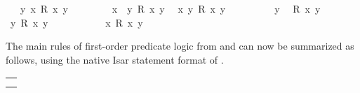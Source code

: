 \begin{isabellebody}
\ \ \ {\isachardoublequoteopen}{\isasymforall}y{\isachardot}\ {\isasymexists}x{\isachardot}\ R\ x\ y{\isachardoublequoteclose}\isanewline
%
\isadelimproof
%
\endisadelimproof
%
\isatagproof
{}\isamarkupfalse%
\ \ \ \ %
\isanewline
\ \ \isamarkupfalse%
\ x\ \ {\isachardoublequoteopen}{\isasymforall}y{\isachardot}\ R\ x\ y{\isachardoublequoteclose}\ \isamarkupfalse%
\ {\isacharbackquoteopen}{\isasymexists}x{\isachardot}\ {\isasymforall}y{\isachardot}\ R\ x\ y{\isacharbackquoteclose}\ \isacommand{{\isachardot}{\isachardot}}\isamarkupfalse%
\ \ \ \ %
\isanewline
\ \ \isamarkupfalse%
\ y\ \isamarkupfalse%
\ {\isachardoublequoteopen}R\ x\ y{\isachardoublequoteclose}\ \isamarkupfalse%
\ {\isacharbackquoteopen}{\isasymforall}y{\isachardot}\ R\ x\ y{\isacharbackquoteclose}\ \isacommand{{\isachardot}{\isachardot}}\isamarkupfalse%
\ \ \ \ %
\isanewline
\ \ \isamarkupfalse%
\ \isamarkupfalse%
\ {\isachardoublequoteopen}{\isasymexists}x{\isachardot}\ R\ x\ y{\isachardoublequoteclose}\ \isacommand{{\isachardot}{\isachardot}}\isamarkupfalse%
\ \ \ \ %
\isanewline
{}\isamarkupfalse%
%
\endisatagproof
{\isafoldproof}%
%
\isadelimproof
%
\endisadelimproof
%
\isamarkuptrue%
%
\begin{isamarkuptext}%
The main rules of first-order predicate logic from
   and 
  can now be summarized as follows, using the native Isar statement
  format of .

  \medskip
  \begin{tabular}{l}
  \isa{{\isachardoublequote}impI{\isacharcolon}\ {\isasymASSUMES}\ A\ {\isasymLongrightarrow}\ B\ {\isasymSHOWS}\ A\ {\isasymlongrightarrow}\ B{\isachardoublequote}} \\
  \isa{{\isachardoublequote}impD{\isacharcolon}\ {\isasymASSUMES}\ A\ {\isasymlongrightarrow}\ B\ {\isasymAND}\ A\ {\isasymSHOWS}\ B{\isachardoublequote}} \\[1ex]


\end{tabular}
\end{isamarkuptext}
\end{isabellebody}
